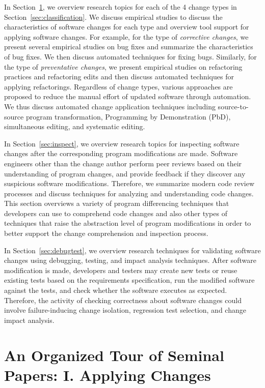 \documentclass[runningheads,a4paper]{llncs}
\begin{document}
In Section~\ref{sec:apply}, we overview research topics for each of the 4 change types in Section~\ref{sec:classification}. We discuss empirical studies to discuss the characteristics of software changes for each type and overview tool support for applying software changes. For example, for the type of {\em corrective changes}, we present several empirical studies on bug fixes and summarize the characteristics of bug fixes. We then discuss automated techniques for fixing bugs. Similarly, for the type of {\em preventative changes}, we present empirical studies on refactoring practices and refactoring edits and then discuss automated techniques for applying refactorings.  Regardless of change types, various approaches are proposed to reduce the manual effort of updated software through automation. We thus discuss automated change application techniques including source-to-source program transformation, Programming by Demonstration (PbD), simultaneous editing, and systematic editing.

In Section~\ref{sec:inspect}, we overview research topics for inspecting software changes after the corresponding program modifications are made. Software engineers other than the change author perform peer reviews based on their understanding of program changes, and provide feedback if they discover any suspicious software modifications. Therefore, we summarize modern code review processes and discuss techniques for analyzing and understanding code changes. This section overviews a variety of program differencing techniques that developers can use to comprehend code changes and also other types of techniques that raise the abstraction level of program modifications in order to better support the change comprehension and inspection process. 

In Section~\ref{sec:debugtest}, we overview research techniques for validating software changes using debugging, testing, and impact analysis techniques. After software modification is made, developers and testers may create new tests or reuse existing tests based on the requirements specification, run the modified software against the tests, and check whether the software executes as expected. Therefore, the activity of checking correctness about software changes could involve failure-inducing change isolation, regression test selection, and change impact analysis. 


\section{An Organized Tour of Seminal Papers: I. Applying Changes}
\label{sec:apply}
\end{document}
